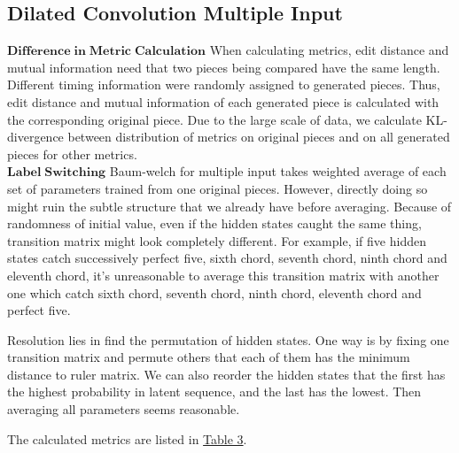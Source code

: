 \documentclass[10pt, oneside]{article}
\begin{document}
\subsection{Dilated Convolution Multiple Input}
$\mathbf{Difference\; in\; Metric\; Calculation}$
When calculating metrics, edit distance and mutual information need that two pieces being compared have the same length. Different timing information were randomly assigned to generated pieces. Thus, edit distance and mutual information of each generated piece is calculated with the corresponding original piece. Due to the large scale of data, we calculate KL-divergence between distribution of metrics on original pieces and on all generated pieces for other metrics. \\



$\mathbf{Label\;Switching}$
Baum-welch for multiple input takes weighted average of each set of parameters trained from one original pieces. However, directly doing so might ruin the subtle structure that we already have before averaging. Because of randomness of initial value, even if the hidden states caught the same thing, transition matrix might look completely different. For example, if five hidden states catch successively perfect five, sixth chord, seventh chord, ninth chord and eleventh chord, it's unreasonable to average this transition matrix with another one which catch sixth chord, seventh chord, ninth chord, eleventh chord and perfect five. 

Resolution lies in find the permutation of hidden states. One way is by fixing one transition matrix and permute others that each of them has the minimum distance to ruler matrix. We can also reorder the hidden states that the first has the highest probability in latent sequence, and the last has the lowest. Then averaging all parameters seems reasonable. 


The calculated metrics are listed in \hyperref[table: multiple metrics]{Table 3}. 
\end{document}
